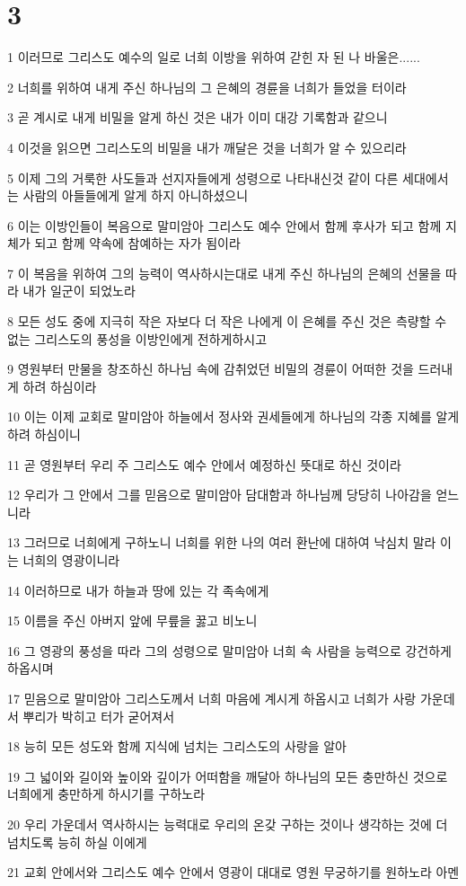 \chapter{3}

\par 1 이러므로 그리스도 예수의 일로 너희 이방을 위하여 갇힌 자 된 나 바울은......
\par 2 너희를 위하여 내게 주신 하나님의 그 은혜의 경륜을 너희가 들었을 터이라
\par 3 곧 계시로 내게 비밀을 알게 하신 것은 내가 이미 대강 기록함과 같으니
\par 4 이것을 읽으면 그리스도의 비밀을 내가 깨달은 것을 너희가 알 수 있으리라
\par 5 이제 그의 거룩한 사도들과 선지자들에게 성령으로 나타내신것 같이 다른 세대에서는 사람의 아들들에게 알게 하지 아니하셨으니
\par 6 이는 이방인들이 복음으로 말미암아 그리스도 예수 안에서 함께 후사가 되고 함께 지체가 되고 함께 약속에 참예하는 자가 됨이라
\par 7 이 복음을 위하여 그의 능력이 역사하시는대로 내게 주신 하나님의 은혜의 선물을 따라 내가 일군이 되었노라
\par 8 모든 성도 중에 지극히 작은 자보다 더 작은 나에게 이 은혜를 주신 것은 측량할 수 없는 그리스도의 풍성을 이방인에게 전하게하시고
\par 9 영원부터 만물을 창조하신 하나님 속에 감취었던 비밀의 경륜이 어떠한 것을 드러내게 하려 하심이라
\par 10 이는 이제 교회로 말미암아 하늘에서 정사와 권세들에게 하나님의 각종 지혜를 알게 하려 하심이니
\par 11 곧 영원부터 우리 주 그리스도 예수 안에서 예정하신 뜻대로 하신 것이라
\par 12 우리가 그 안에서 그를 믿음으로 말미암아 담대함과 하나님께 당당히 나아감을 얻느니라
\par 13 그러므로 너희에게 구하노니 너희를 위한 나의 여러 환난에 대하여 낙심치 말라 이는 너희의 영광이니라
\par 14 이러하므로 내가 하늘과 땅에 있는 각 족속에게
\par 15 이름을 주신 아버지 앞에 무릎을 꿇고 비노니
\par 16 그 영광의 풍성을 따라 그의 성령으로 말미암아 너희 속 사람을 능력으로 강건하게 하옵시며
\par 17 믿음으로 말미암아 그리스도께서 너희 마음에 계시게 하옵시고 너희가 사랑 가운데서 뿌리가 박히고 터가 굳어져서
\par 18 능히 모든 성도와 함께 지식에 넘치는 그리스도의 사랑을 알아
\par 19 그 넓이와 길이와 높이와 깊이가 어떠함을 깨달아 하나님의 모든 충만하신 것으로 너희에게 충만하게 하시기를 구하노라
\par 20 우리 가운데서 역사하시는 능력대로 우리의 온갖 구하는 것이나 생각하는 것에 더 넘치도록 능히 하실 이에게
\par 21 교회 안에서와 그리스도 예수 안에서 영광이 대대로 영원 무궁하기를 원하노라 아멘

